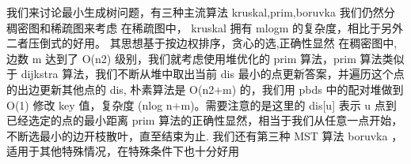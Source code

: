 {}\markdownRendererSectionBegin
{}\markdownRendererInterblockSeparator
{}我们来讨论最小生成树问题，有三种主流算法\markdownRendererDollarSign{} kruskal,prim,boruvka \markdownRendererDollarSign{}\markdownRendererParagraphSeparator
{}我们仍然分稠密图和稀疏图来考虑\markdownRendererParagraphSeparator
{}在稀疏图中，\markdownRendererDollarSign{} kruskal \markdownRendererDollarSign{}拥有\markdownRendererDollarSign{} mlogm \markdownRendererDollarSign{}的复杂度，相比于另外二者压倒式的好用。\markdownRendererParagraphSeparator
{}其思想基于按边权排序，贪心的选,正确性显然\markdownRendererInterblockSeparator
{}\markdownRendererSectionBegin
{}\markdownRendererInterblockSeparator
{}\markdownRendererInterblockSeparator
{}在稠密图中, 边数 \markdownRendererDollarSign{}m\markdownRendererDollarSign{} 达到了 \markdownRendererDollarSign{}O(n\markdownRendererCircumflex{}2)\markdownRendererDollarSign{} 级别，我们就考虑使用堆优化的 \markdownRendererDollarSign{}prim\markdownRendererDollarSign{} 算法，\markdownRendererDollarSign{}prim\markdownRendererDollarSign{} 算法类似于 \markdownRendererDollarSign{}dijkstra\markdownRendererDollarSign{} 算法，我们不断从堆中取出当前 \markdownRendererDollarSign{}dis\markdownRendererDollarSign{} 最小的点更新答案，并遍历这个点的出边更新其他点的 \markdownRendererDollarSign{}dis\markdownRendererDollarSign{}, 朴素算法是 \markdownRendererDollarSign{}O(n\markdownRendererCircumflex{}2+m)\markdownRendererDollarSign{} 的，我们用 \markdownRendererDollarSign{}pbds\markdownRendererDollarSign{} 中的配对堆做到 \markdownRendererDollarSign{}O(1)\markdownRendererDollarSign{} 修改 key 值，复杂度 \markdownRendererDollarSign{}(n\markdownRendererBackslash{}log n+m)\markdownRendererDollarSign{}。需要注意的是这里的 \markdownRendererDollarSign{}dis[u]\markdownRendererDollarSign{} 表示 \markdownRendererDollarSign{}u\markdownRendererDollarSign{} 点到已经选定的点的最小距离\markdownRendererParagraphSeparator
{}\markdownRendererDollarSign{} prim \markdownRendererDollarSign{}算法的正确性显然，相当于我们从任意一点开始，不断选最小的边开枝散叶，直至结束为止.\markdownRendererInterblockSeparator
{}
\markdownRendererSectionEnd \markdownRendererSectionBegin
{}\markdownRendererInterblockSeparator
{}\markdownRendererInterblockSeparator
{}我们还有第三种\markdownRendererDollarSign{} MST \markdownRendererDollarSign{}算法\markdownRendererDollarSign{} boruvka \markdownRendererDollarSign{}，适用于其他特殊情况，在特殊条件下也十分好用\markdownRendererParagraphSeparator
